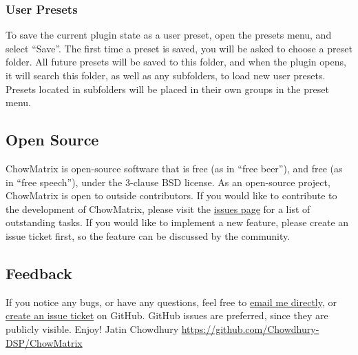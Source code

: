 \documentclass[landscape,twocolumn,a5paper]{manual}
\begin{document}
\subsubsection{User Presets}
To save the current plugin state as a user preset, open
the presets menu, and select ``Save''. The first time a
preset is saved, you will be asked to choose a preset
folder. All future presets will be saved to this folder,
and when the plugin opens, it will search this folder, as
well as any subfolders, to load new user presets.
Presets located in subfolders will be placed in their
own groups in the preset menu.

\subsection{Open Source}
ChowMatrix is open-source software that is free (as in ``free
beer''), and free (as in ``free speech''), under the
3-clause BSD license. As an open-source project, ChowMatrix is
open to outside contributors. If you would like to contribute
to the development of ChowMatrix, please visit the
\href{https://github.com/Chowdhury-DSP/ChowMatrix/issues}{issues page}
for a list of outstanding tasks. If you would like to implement
a new feature, please create an issue ticket first, so the
feature can be discussed by the community.

\subsection{Feedback}
If you notice any bugs, or have any questions, feel free
to \href{mailto:chowdsp@gmail.com}{email me directly},
or \href{https://github.com/Chowdhury-DSP/ChowMatrix/issues}{create an issue ticket}
on GitHub. GitHub issues are preferred, since they are publicly
visible.
\newpar
Enjoy!
\newpar
Jatin Chowdhury
\newpar
\href{https://github.com/Chowdhury-DSP/ChowMatrix}{https://github.com/Chowdhury-DSP/ChowMatrix}
\end{document}
